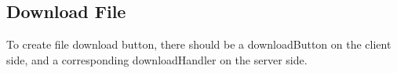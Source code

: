 \subsection*{Download File}



To create file download button, there should be a downloadButton on the client side, and a corresponding downloadHandler on the server side.
